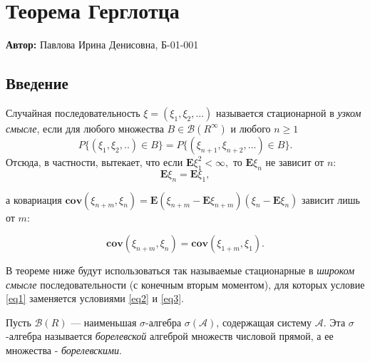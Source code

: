 
\section{Теорема Герглотца}

\textbf{Автор:} Павлова Ирина Денисовна, Б-01-001

\subsection{Введение}

Случайная последовательность $\xi = (\xi_1, \xi_2, ...)$ называется стационарной в \textit{узком смысле}, если для любого множества $B \in \mathcal{B}(R^{\infty})$ и любого $n \geq 1$
\begin{equation}\label{eq1} 
    P \{ (\xi_1, \xi_2, ..) \in B\} = P\{(\xi_{n+1}, \xi_{n+2}, ...) \in B\}.
\end{equation}
Отсюда, в частности, вытекает, что если $\mathbf{E}\xi_1^2 < \infty,$ то  $\mathbf{E}\xi_n$ не зависит от $n$:
\begin{equation}\label{eq2} 
    \mathbf{E}\xi_n = \mathbf{E}\xi_1,
\end{equation}

а ковариация $\mathbf{cov}(\xi_{n+m}, \xi_n) = \mathbf{E}(\xi_{n+m} - \mathbf{E}\xi_{n+m})(\xi_n - \mathbf{E}\xi_n)$ зависит лишь от $m$:

\begin{equation}\label{eq3} 
    \mathbf{cov}(\xi_{n+m}, \xi_n) = \mathbf{cov}(\xi_{1+m}, \xi_1).
\end{equation}

В теореме ниже будут использоваться так называемые стационарные в \textit{широком смысле} последовательности (с конечным вторым моментом), для которых условие \ref{eq1} заменяется условиями \ref{eq2} и \ref{eq3}.

\begin{definition}
    Пусть $\mathcal{B}(R)$ --- наименьшая $\sigma$-алгебра $\sigma(\mathcal{A})$, содержащая систему $\mathcal{A}$. Эта $\sigma$-алгебра называется \textit{борелевской} алгеброй множеств числовой прямой, а ее множества - \textit{борелевскими}.
\end{definition}


